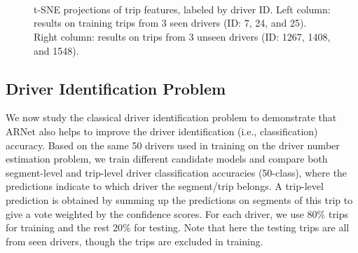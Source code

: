 \documentclass{article}
\begin{document}
\begin{figure}[tb]
\centering
{}
\\
\vspace{-0.15in}

\\
\vspace{-0.15in}

\\
\vspace{-0.15in}

\vspace{-0.17in}

\caption{t-SNE projections of trip features, labeled by driver ID.
Left column: results on training trips from 3 seen drivers (ID: 7, 24, and 25).
Right column: results on trips from 3 unseen drivers (ID: 1267, 1408, and 1548).%
}
\label{fig:tSNE}
\vspace{-0.12in}
\end{figure}


\subsection{Driver Identification Problem}
We now study the classical driver identification problem to demonstrate that ARNet also helps to improve the driver identification (i.e., classification) accuracy.
Based on the same 50 drivers used in training on the driver number estimation problem, we train different candidate models and compare both segment-level and trip-level driver classification accuracies (50-class), where the predictions indicate to which driver the segment/trip belongs.
A trip-level prediction is obtained by summing up the predictions on segments of this trip to give a vote weighted by the confidence scores.
For each driver, we use 80\% trips for training and the rest 20\% for testing.
Note that here the testing trips are all from seen drivers, though the trips are excluded in training.
\end{document}
